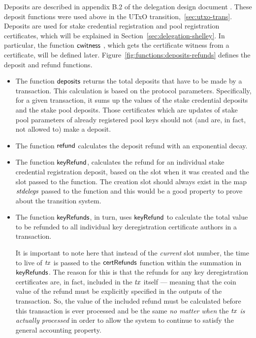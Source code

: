 Deposits are described in appendix B.2 of the delegation design document
\cite{delegation_design}.  These deposit functions were used above in the UTxO
transition,~\ref{sec:utxo-trans}. Deposits are used for stake credential
registration and pool registration certificates, which will be explained in
Section~\ref{sec:delegation-shelley}.  In particular, the function
$\mathsf{cwitness}~ \mathit{}$, which gets the certificate witness from a certificate, will be
defined later.  Figure~\ref{fig:functions:deposits-refunds} defines the deposit
and refund functions.
\begin{itemize}
\item The function $\mathsf{deposits}$ returns the total deposits that have to be
  made by a transaction.  This calculation is based on the protocol parameters.
  Specifically, for a given transaction, it sums up the values of the stake
  credential deposits and the stake pool deposits. Those certificates which are
  updates of stake pool parameters of already registered pool keys should not
  (and are, in fact, not allowed to) make a deposit.
  \item The function $\mathsf{refund}$ calculates the deposit refund with an exponential decay.
  \item The function $\mathsf{keyRefund}$, calculates the refund for an individual
    stake credential registration deposit, based on the slot when it was created
    and the slot passed to the function. The creation slot should always exist
    in the map $\mathit{stdelegs}$ passed to the function and this would be a good
    property to prove about the transition system.
  \item The function $\mathsf{keyRefunds}$, in turn, uses $\mathsf{keyRefund}$ to calculate
    the total value to be refunded to all individual key deregistration certificate authors
    in a transaction.

    It is important to note here that instead of the \textit{current} slot number,
    the time to live of $\mathit{tx}$ is passed to the $\mathsf{certRefunds}$ function
    within the summation in $\mathsf{keyRefunds}$. The reason for this is that the
    refunds for any key deregistration certificates are, in fact, included in
    the $\mathit{tx}$ itself --- meaning that the coin value of the refund must be
    explicitly specified in the outputs of the transaction. So,
    the value of the included refund must be calculated before this transaction
    is ever processed and be the same \textit{no matter when} the $\mathit{tx}$
    \textit{is actually processed} in order to allow the system to continue to
    satisfy the general accounting property.


\end{itemize}
